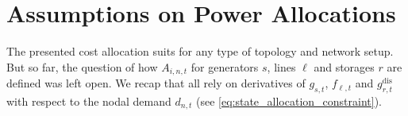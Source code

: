\documentclass[11pt,twocolumn]{article}
\newcommand{\costfactor}{\gamma_{i,t}}
\newcommand{\generation}{g_{s,t}}
\newcommand{\muuppergenerationnom}{\bar{\mu}^\text{nom}_{s}}
\newcommand{\flow}{f_{\ell,t}}
\newcommand{\storage}{g_{r,t}}
\newcommand{\storagedispatch}{\storage^\text{dis}}
\newcommand{\demand}[1][n]{d_{#1,t}}
\newcommand{\allocatestate}[1][i, n]{A_{#1,t}}
\begin{document}




\section{Assumptions on Power Allocations}
\label{sec:localizing_allocations}

The presented cost allocation suits for any type of topology and network setup. But so far, the question of how $\allocatestate$ for generators $s$, lines $\ell$ and storages $r$ are defined was left open. We recap that all rely on derivatives of $\generation$, $\flow$ and $\storagedispatch$  with respect to the nodal demand $\demand$ (see \cref{eq:state_allocation_constraint}). \\
\end{document}
